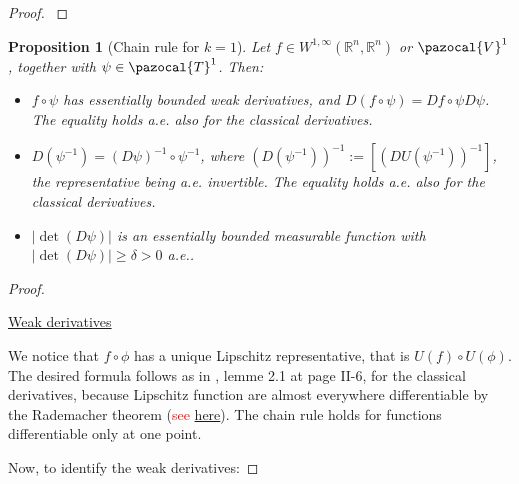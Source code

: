 \documentclass[english,a4paper,9pt,oneside]{scrbook}	%
\theoremstyle{break}
\newtheorem{prop}[equation]{Proposition}
\newenvironment{mproof}[1][\proofname]{%
  \begin{proof}[#1]$ $\par\nobreak\ignorespaces
}{%
  \end{proof}
}
\renewcommand*{\proofname}{Proof}
\theoremstyle{remark}
\newcommand{\mR}{\mathbb{R}}
\newcommand{\cV}{\pazocal{V}}
\newcommand{\cT}{\pazocal{T}}
\newcommand{\tred}[1]{\textcolor{red}{#1}}
\begin{document}
\begin{appendices}
\begin{mproof}
\end{mproof}


\begin{prop}[Chain rule for $k=1$]
\label{prop:chain}
Let $f \in W^{1,\infty}(\mR^n,\mR^n)$ or $\cV^1$, together with $\psi \in \cT^1$.  Then:

\begin{itemize}

\item $f \circ \psi$ has essentially bounded weak derivatives, and $D(f \circ \psi) = Df \circ \psi D\psi$. The equality holds a.e. also for the classical derivatives.

\item  $D(\psi^{-1}) = (D\psi)^{-1} \circ \psi^{-1}$, where $(D(\psi^{-1}))^{-1}:=[(DU(\psi^{-1}))^{-1}]$, the representative being a.e. invertible. The equality holds a.e. also for the classical derivatives.

\item $|\det(D\psi)|$ is an essentially bounded measurable function with $|\det(D\psi)|\geq \delta>0$ a.e.. 
\end{itemize} 

\end{prop}
\begin{mproof}

\underline{Weak derivatives}

We notice that $f \circ \phi$ has a unique Lipschitz representative, that is $U(f)\circ U(\phi)$. The desired formula follows as in \cite{murat}, lemme 2.1 at page II-6, for the classical derivatives, because Lipschitz function are almost everywhere differentiable by the Rademacher theorem (\tred{see \href{https://abel.math.harvard.edu/archive/212b_spring_05/handouts/Rademacher.pdf}{here}}). The chain rule holds for functions differentiable only at one point. 


Now, to identify the weak derivatives:


\end{mproof}
\end{appendices}
\end{document}
